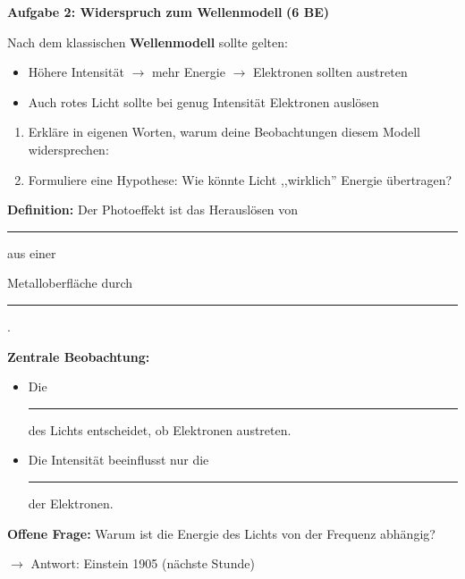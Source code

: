 \documentclass[11pt,a4paper]{article}
\begin{document}
\vspace{0.5em}


\textbf{Aufgabe 2: Widerspruch zum Wellenmodell} \hfill \textbf{(6 BE)}

Nach dem klassischen \textbf{Wellenmodell} sollte gelten:
\begin{itemize}[nosep]
\item Höhere Intensität $\rightarrow$ mehr Energie $\rightarrow$ Elektronen sollten austreten
\item Auch rotes Licht sollte bei genug Intensität Elektronen auslösen
\end{itemize}

\begin{enumerate}[label=\alph*)]
\item Erkläre in eigenen Worten, warum deine Beobachtungen diesem Modell widersprechen:

\begin{tcolorbox}[leerbox=3cm]
\end{tcolorbox}

\item Formuliere eine Hypothese: Wie könnte Licht ,,wirklich'' Energie übertragen?

\begin{tcolorbox}[leerbox=2cm]
\end{tcolorbox}
\end{enumerate}

\vspace{0.5em}


\begin{tcolorbox}[merkbox={Kasten 1: Merksatz -- Photoeffekt}]
\textbf{Definition:} Der Photoeffekt ist das Herauslösen von \rule{3cm}{0.4pt} aus einer

Metalloberfläche durch \rule{3cm}{0.4pt}.

\vspace{0.5em}

\textbf{Zentrale Beobachtung:}

\begin{itemize}[nosep]
\item Die \rule{3cm}{0.4pt} des Lichts entscheidet, ob Elektronen austreten.
\item Die Intensität beeinflusst nur die \rule{3cm}{0.4pt} der Elektronen.
\end{itemize}

\vspace{0.5em}

\textbf{Offene Frage:} Warum ist die Energie des Lichts von der Frequenz abhängig?

$\rightarrow$ Antwort: Einstein 1905 (nächste Stunde)
\end{tcolorbox}
\end{document}

